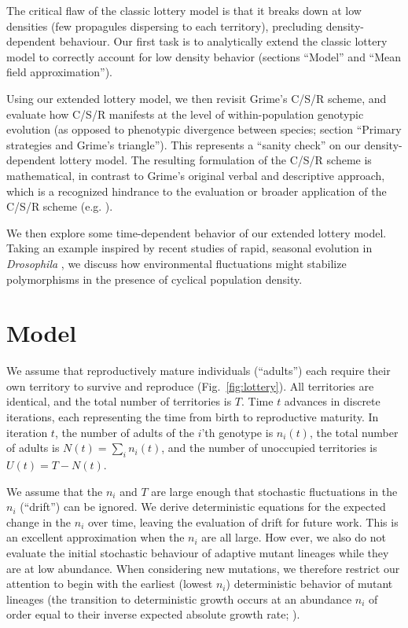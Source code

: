 \documentclass[11pt]{article}
\begin{document}
The critical flaw of the classic lottery model is that it breaks down at low densities (few propagules dispersing to each territory), precluding density-dependent behaviour. Our first task is to analytically extend the classic lottery model to correctly account for low density behavior (sections ``Model'' and ``Mean field approximation'').

Using our extended lottery model, we then revisit Grime's C/S/R scheme,  and evaluate how C/S/R manifests at the level of within-population genotypic evolution (as opposed to phenotypic divergence between species; section ``Primary strategies and Grime's triangle''). This represents a ``sanity check'' on our density-dependent lottery model. The resulting formulation of the C/S/R scheme is mathematical, in contrast to Grime's original verbal and descriptive approach, which is a recognized hindrance to the evaluation or broader application of the C/S/R scheme (e.g. \citealt{tilman_2007}).

We then explore some time-dependent behavior of our extended lottery model. Taking an example inspired by recent studies of rapid, seasonal evolution in \textit{Drosophila} \citep{bergland_14}, we discuss how environmental fluctuations might stabilize polymorphisms in the presence of cyclical population density. 
 
\section*{Model}\label{sec:model}

We assume that reproductively mature individuals (``adults'') each require their own territory to survive and reproduce (Fig.~\ref{fig:lottery}). All territories are identical, and the total number of territories is $T$. Time $t$ advances in discrete iterations, each representing the time from birth to reproductive maturity. In iteration $t$, the number of adults of the $i$'th genotype is $n_i(t)$, the total number of adults is $N(t)=\sum_i n_i(t)$, and the number of unoccupied territories is $U(t)=T-N(t)$. 

We assume that the $n_i$ and $T$ are large enough that stochastic fluctuations in the $n_i$ (``drift'') can be ignored. We derive deterministic equations for the expected change in the $n_i$ over time, leaving the evaluation of drift for future work. This is an excellent approximation when the $n_i$ are all large. How ever, we also do not evaluate the initial stochastic behaviour of adaptive mutant lineages while they are at low abundance. When considering new mutations, we therefore restrict our attention to begin with the earliest (lowest $n_i$) deterministic behavior of mutant lineages (the transition to deterministic growth occurs at an abundance $n_i$ of order equal to their inverse expected absolute growth rate; \citealt{uecker_2011}).
\end{document}
